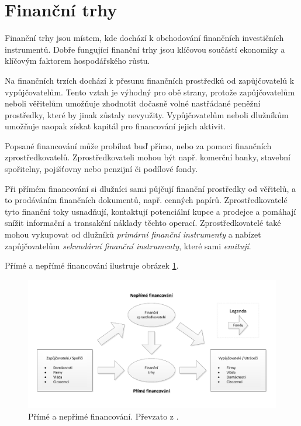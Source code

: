 \documentclass[thesis=M,czech]{FITthesis}[2012/06/26]
\begin{document}

\section{Finanční trhy}
\label{sec:12}

Finanční trhy jsou místem, kde dochází k obchodování finančních investičních instrumentů. Dobře fungující finanční trhy 
jsou klíčovou součástí ekonomiky a klíčovým faktorem hospodářského růstu.  %

Na finančních trzích dochází k přesunu finančních prostředků od zapůjčovatelů k vypůjčovatelům. Tento vztah je výhodný 
pro obě strany, protože zapůjčovatelům neboli věřitelům umožňuje zhodnotit dočasně volné nastřádané peněžní prostředky, 
které by jinak zůstaly nevyužity. Vypůjčovatelům neboli dlužníkům umožňuje naopak získat kapitál pro financování jejich 
aktivit.  %

Popsané financování může probíhat buď přímo, nebo za pomoci finančních zprostředkovatelů. Zprostředkovateli mohou 
být např. komerční banky, stavební spořitelny, pojišťovny nebo penzijní či podílové fondy.  %

Při přímém financování si dlužníci sami půjčují finanční prostředky od věřitelů, a to prodáváním finančních dokumentů, 
např. cenných papírů. Zprostředkovatelé tyto finanční toky usnadňují, kontaktují potenciální kupce a prodejce a pomáhají 
snížit informační a transakční náklady těchto operací. Zprostředkovatelé také mohou vykupovat od dlužníků \textit{primární finanční 
instrumenty} a nabízet zapůjčovatelům \textit{sekundární finanční instrumenty}, které sami \textit{emitují}. %


Přímé a nepřímé financování ilustruje obrázek \ref{fig:fintrh}.  

\begin{figure}\centering
	\includegraphics[width=\textwidth]{images/fintrh} 
	\caption[Přímé a nepřímé financování]{Přímé a nepřímé financování. Převzato z \cite{zakpriban}.}\label{fig:fintrh}
\end{figure}
\end{document}
